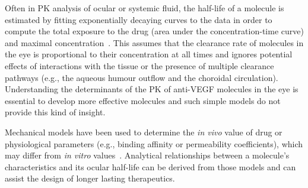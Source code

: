 \documentclass{article}
\begin{document}
Often in PK analysis of ocular or systemic fluid, the half-life of a molecule is estimated by fitting exponentially decaying curves to the data in order to compute the total exposure to the drug (area under the concentration-time curve) and maximal concentration~\cite{Bakri_2007, Kaiser_2019, Park_2015, Park_2016, Xu_2013}.
This assumes that the clearance rate of molecules in the eye is proportional to their concentration at all times and ignores potential effects of interactions with the tissue or the presence of multiple clearance pathways (e.g., the aqueous humour outflow and the choroidal circulation).
Understanding the determinants of the PK of anti-VEGF molecules in the eye is essential to develop more effective molecules and such simple models do not provide this kind of insight.

Mechanical models have been used to determine the \textit{in vivo} value of drug or physiological parameters (e.g., binding affinity or permeability coefficients), which may differ from \textit{in vitro} values~\cite{Bussing_2020,Caruso_2020,HuttonSmith_2016,HuttonSmith_2017,HuttonSmith_2018}.
Analytical relationships between a molecule's characteristics and its ocular half-life can be derived from those models and can assist the design of longer lasting therapeutics.
\end{document}
